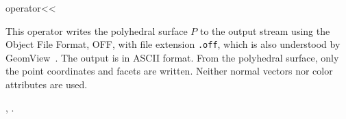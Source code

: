

\ccHtmlNoClassLinks
\begin{ccRefFunction}{operator<<}
\label{refPolyhedron_operator_leftshift}

\ccDefinition

This operator writes the polyhedral surface $P$ to the output stream
 using the Object File Format, OFF, with file extension 
{\tt .off}, which is also understood by
GeomView~\cite{p-gmgv15-94}. The output is in ASCII format. From the
polyhedral surface, only the point coordinates and facets are
written. Neither normal vectors nor color attributes are used.


  
\ccSeeAlso

,
.


\end{ccRefFunction}


